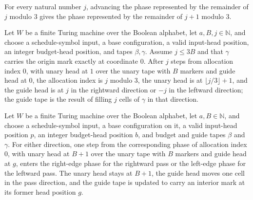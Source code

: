 \begin{lemma}
\label{Complexity.nextThird_mod}
\leanok
{}
For every natural number $j$, advancing the phase represented by the remainder of $j$
modulo $3$ gives the phase represented by the remainder of $j+1$ modulo $3$.
\end{lemma}

\begin{lemma}
\label{Complexity.setupCfg_layout_prefix}
\leanok
{}
Let $W$ be a finite Turing machine over the Boolean alphabet, let $a,B,j\in\mathbb{N}$,
and choose a schedule-symbol input, a base configuration, a valid input-head position,
an integer budget-head position, and tapes $\beta,\gamma$. Assume $j\le 3B$ and that
$\gamma$ carries the origin mark exactly at coordinate $0$. After $j$ steps from
allocation index $0$, with unary head at $1$ over the unary tape with $B$ markers and
guide head at $0$, the allocation index is $j$ modulo $3$, the unary head is at $\lfloor
j/3\rfloor+1$, and the guide head is at $j$ in the rightward direction or $-j$ in the
leftward direction; the guide tape is the result of filling $j$ cells of $\gamma$ in
that direction.
\end{lemma}

\begin{lemma}
\label{Complexity.setupCfg_layout_end}
\leanok
{}
Let $W$ be a finite Turing machine over the Boolean alphabet, let $a,B\in\mathbb{N}$,
and choose a schedule-symbol input, a base configuration on it, a valid input-head
position $p$, an integer budget-head position $b$, and budget and guide tapes $\beta$
and $\gamma$. For either direction, one step from the corresponding phase of allocation
index $0$, with unary head at $B+1$ over the unary tape with $B$ markers and guide head
at $g$, enters the right-edge phase for the rightward pass or the left-edge phase for
the leftward pass. The unary head stays at $B+1$, the guide head moves one cell in the
pass direction, and the guide tape is updated to carry an interior mark at its former
head position $g$.
\end{lemma}

